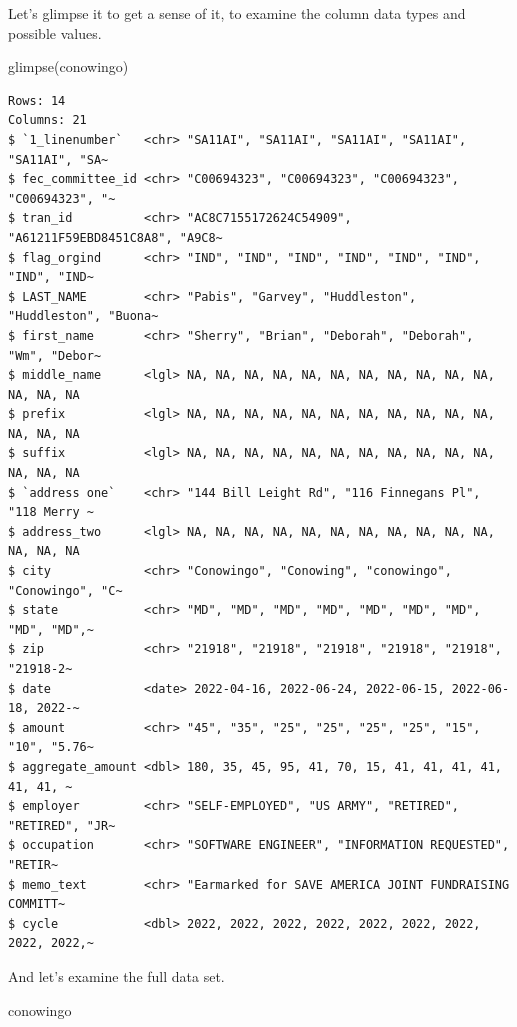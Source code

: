 \documentclass[
  letterpaper,
  DIV=11,
  numbers=noendperiod]{scrreprt}
\newenvironment{Shaded}{\begin{snugshade}}{\end{snugshade}}
\newcommand{\FunctionTok}[1]{\textcolor[rgb]{0.28,0.35,0.67}{#1}}
\newcommand{\NormalTok}[1]{\textcolor[rgb]{0.00,0.23,0.31}{#1}}
\begin{document}
Let's glimpse it to get a sense of it, to examine the column data types
and possible values.

\begin{Shaded}
\begin{Highlighting}[]
\FunctionTok{glimpse}\NormalTok{(conowingo)}
\end{Highlighting}
\end{Shaded}

\begin{verbatim}
Rows: 14
Columns: 21
$ `1_linenumber`   <chr> "SA11AI", "SA11AI", "SA11AI", "SA11AI", "SA11AI", "SA~
$ fec_committee_id <chr> "C00694323", "C00694323", "C00694323", "C00694323", "~
$ tran_id          <chr> "AC8C7155172624C54909", "A61211F59EBD8451C8A8", "A9C8~
$ flag_orgind      <chr> "IND", "IND", "IND", "IND", "IND", "IND", "IND", "IND~
$ LAST_NAME        <chr> "Pabis", "Garvey", "Huddleston", "Huddleston", "Buona~
$ first_name       <chr> "Sherry", "Brian", "Deborah", "Deborah", "Wm", "Debor~
$ middle_name      <lgl> NA, NA, NA, NA, NA, NA, NA, NA, NA, NA, NA, NA, NA, NA
$ prefix           <lgl> NA, NA, NA, NA, NA, NA, NA, NA, NA, NA, NA, NA, NA, NA
$ suffix           <lgl> NA, NA, NA, NA, NA, NA, NA, NA, NA, NA, NA, NA, NA, NA
$ `address one`    <chr> "144 Bill Leight Rd", "116 Finnegans Pl", "118 Merry ~
$ address_two      <lgl> NA, NA, NA, NA, NA, NA, NA, NA, NA, NA, NA, NA, NA, NA
$ city             <chr> "Conowingo", "Conowing", "conowingo", "Conowingo", "C~
$ state            <chr> "MD", "MD", "MD", "MD", "MD", "MD", "MD", "MD", "MD",~
$ zip              <chr> "21918", "21918", "21918", "21918", "21918", "21918-2~
$ date             <date> 2022-04-16, 2022-06-24, 2022-06-15, 2022-06-18, 2022-~
$ amount           <chr> "45", "35", "25", "25", "25", "25", "15", "10", "5.76~
$ aggregate_amount <dbl> 180, 35, 45, 95, 41, 70, 15, 41, 41, 41, 41, 41, 41, ~
$ employer         <chr> "SELF-EMPLOYED", "US ARMY", "RETIRED", "RETIRED", "JR~
$ occupation       <chr> "SOFTWARE ENGINEER", "INFORMATION REQUESTED", "RETIR~
$ memo_text        <chr> "Earmarked for SAVE AMERICA JOINT FUNDRAISING COMMITT~
$ cycle            <dbl> 2022, 2022, 2022, 2022, 2022, 2022, 2022, 2022, 2022,~
\end{verbatim}

And let's examine the full data set.

\begin{Shaded}
\begin{Highlighting}[]
\NormalTok{conowingo}
\end{Highlighting}
\end{Shaded}
\end{document}
